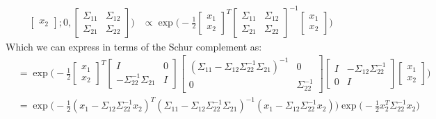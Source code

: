 \documentclass{article}
\begin{document}
\begin{enumerate}[(a)]
\begin{enumerate}[(i)]
\begin{align*}
\begin{bmatrix}
            x_2
        \end{bmatrix}; 0 , \begin{bmatrix}
            \Sigma_{11} & \Sigma_{12} \\ 
            \Sigma_{21} & \Sigma_{22}
        \end{bmatrix}
        \biggr) &\propto \exp\biggl(-\frac{1}{2}\begin{bmatrix}
            x_1 \\
            x_2
        \end{bmatrix}^T\begin{bmatrix}
            \Sigma_{11} & \Sigma_{12} \\ 
            \Sigma_{21} & \Sigma_{22}
        \end{bmatrix}^{-1}\begin{bmatrix}
            x_1 \\
            x_2
        \end{bmatrix}
        \biggr)
    \end{align*}
    Which we can express in terms of the Schur complement as: 
    \begin{align*}
        &= \exp\biggl(-\frac{1}{2}\begin{bmatrix}
            x_1 \\
            x_2
        \end{bmatrix}^T\begin{bmatrix}
            I & 0 \\ 
            -\Sigma_{22}^{-1}\Sigma_{21} & I
        \end{bmatrix}
        \begin{bmatrix}
            (\Sigma_{11} - \Sigma_{12}\Sigma_{22}^{-1}\Sigma_{21})^{-1}& 0 \\ 
            0 & \Sigma_{22}^{-1}
        \end{bmatrix}
        \begin{bmatrix}
            I & -\Sigma_{12}\Sigma_{22}^{-1} \\ 
            0 & I
        \end{bmatrix}
        \begin{bmatrix}
            x_1 \\
            x_2
        \end{bmatrix}
        \biggr) \\[1.0ex]
        &= \exp \biggl(-\frac{1}{2}(x_1 - \Sigma_{12}\Sigma_{22}^{-1}x_2)^T(\Sigma_{11} - \Sigma_{12}\Sigma_{22}^{-1}\Sigma_{21})^{-1}(x_1 - \Sigma_{12}\Sigma_{22}^{-1}x_2)\biggr)\exp\biggl(-\frac{1}{2}x_2^T\Sigma_{22}^{-1}x_2\biggr)

\end{align*}
\end{enumerate}
\end{enumerate}
\end{document}
